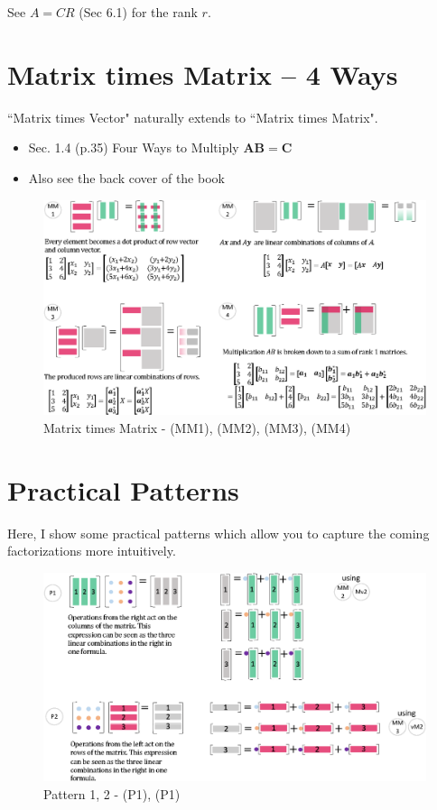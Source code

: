 \documentclass[letterpaper]{article}
\begin{document}
See $A=CR$ (Sec 6.1) for the rank $r$.


\section{Matrix times Matrix -- 4 Ways}

``Matrix times Vector" naturally extends to ``Matrix times Matrix".

\begin{itemize}
  \item Sec. 1.4 (p.35) Four Ways to Multiply $\bm{AB=C}$
  \item Also see the back cover of the book
\end{itemize} 


\begin{figure}[H]
  \centering
  \includegraphics[scale=0.8]{MatrixTimesMatrix.eps}
  \caption{Matrix times Matrix - (MM1), (MM2), (MM3), (MM4)}
\end{figure}

\section{Practical Patterns}

Here, I show some practical patterns which allow you to capture
the coming factorizations more intuitively.

\begin{figure}[H]
  \centering
  \includegraphics[scale=0.8]{Pattern12.eps}
  \caption{Pattern 1, 2 - (P1), (P1)}
\end{figure}
\end{document}
